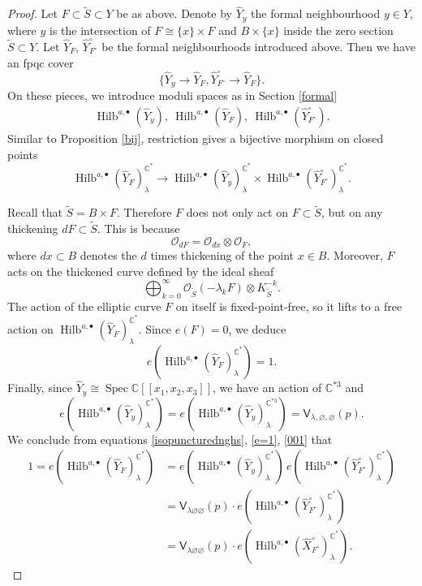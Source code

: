 \documentclass{amsart}
\theoremstyle{definition}
\newcommand{\CC} {\mathbb{C}}          %
\renewcommand{\O}{\mathcal{O}}
\newcommand{\sfV}{\mathsf{V}}
\newcommand{\Hilb}{\operatorname{Hilb}}
\newcommand{\Spec}{\operatorname{Spec}}
\begin{document}
\begin{proof}
Let $F \subset \tilde{S} \subset Y$ be as above. Denote by $\widehat{Y}_{y}$ the formal neighbourhood $y \in Y$, where $y$ is the intersection of $F \cong \{x\} \times F$ and $B \times \{x\}$ inside the zero section $\tilde{S} \subset Y$. Let $\widehat{Y}_F$, $\widehat{Y}^{\circ}_{F^\circ}$ be the formal neighbourhoods introduced above. Then we have an fpqc cover
$$
\{\widehat{Y}_y \rightarrow \widehat{Y}_F, \widehat{Y}^{\circ}_{F^\circ} \rightarrow \widehat{Y}_F\}. 
$$
On these pieces, we introduce moduli spaces as in Section \ref{formal}
\begin{align*}
\Hilb^{a,\bullet}(\widehat{Y}_y), \ \Hilb^{a,\bullet}(\widehat{Y}_F), \ \Hilb^{a,\bullet}(\widehat{Y}^{\circ}_{F^\circ}).
\end{align*}
Similar to Proposition \ref{bij}, restriction gives a bijective morphism on closed points
$$
\Hilb^{a,\bullet}(\widehat{Y}_F)^{\CC^*}_{\lambda} \rightarrow \Hilb^{a,\bullet}(\widehat{Y}_y)^{\CC^*}_{\lambda} \times \Hilb^{a,\bullet}(\widehat{Y}^{\circ}_{F^\circ})^{\CC^*}_{\lambda}.
$$

Recall that $\tilde{S} = B \times F$. Therefore $F$ does not only act on $F \subset \tilde{S}$, but on any thickening $d F \subset \tilde{S}$. This is because
$$
\O_{dF} = \O_{d x} \otimes \O_F,
$$
where $dx \subset B$ denotes the $d$ times thickening of the point $x \in B$. Moreover, $F$ acts on the thickened curve defined by the ideal sheaf
$$
\bigoplus_{k=0}^{\infty} \O_{\tilde{S}}(-\lambda_k F) \otimes K_{\tilde{S}}^{-k}.
$$
The action of the elliptic curve $F$ on itself is fixed-point-free, so it lifts to a free action on $\Hilb^{a,\bullet}(\widehat{Y}_F)^{\CC^*}_{\lambda}$. Since $e(F) = 0$, we deduce
\begin{equation} \label{e=1}
e(\Hilb^{a,\bullet}(\widehat{Y}_F)^{\CC^*}_{\lambda}) = 1.
\end{equation}
Finally, since $\widehat{Y}_y \cong \Spec \CC[\![x_1,x_2,x_3]\!]$, we have an action of $\CC^{*3}$ and 
\begin{equation} \label{001}
e(\Hilb^{a,\bullet}(\widehat{Y}_y)^{\CC^*}_{\lambda}) = e(\Hilb^{a,\bullet}(\widehat{Y}_y)^{\CC^{*3}}_{\lambda}) = \sfV_{\lambda,\varnothing,\varnothing}(p).
\end{equation}
We conclude from equations \eqref{isopuncturednghs}, \eqref{e=1}, \eqref{001} that
\begin{align*}
1=e(\Hilb^{a,\bullet}(\widehat{Y}_F)^{\CC^*}_{\lambda}) &= e( \Hilb^{a,\bullet}(\widehat{Y}_y)^{\CC^*}_{\lambda}) \, e(\Hilb^{a,\bullet}(\widehat{Y}^{\circ}_{F^\circ})^{\CC^*}_{\lambda}) \\
&=  \sfV_{\lambda\varnothing\varnothing}(p) \cdot e(\Hilb^{a,\bullet}(\widehat{Y}^{\circ}_{F^\circ})^{\CC^*}_{\lambda}) \\
&=  \sfV_{\lambda\varnothing\varnothing}(p) \cdot e(\Hilb^{a,\bullet}(\widehat{X}^{\circ}_{F^\circ})^{\CC^*}_{\lambda}).
\end{align*}


\end{proof}
\end{document}
